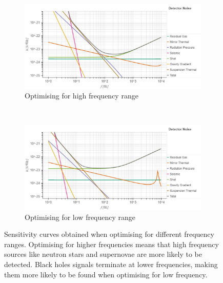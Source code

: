 \documentclass{article}
\begin{document}
    \begin{figure}[h!]
\centering
\begin{subfigure}{.8\textwidth}
        \centering
\includegraphics[width=1\linewidth, trim = {0 0 0 1cm}, clip]{HighFreq.pdf}
         \caption{Optimising for high frequency range}
         \end{subfigure}%
         \\
        \begin{subfigure}{.8\textwidth}
        \centering
        \includegraphics[width=1\linewidth, trim = {0 0 0 0.9cm}, clip]
{LowFreq.pdf}
         \caption{Optimising for low frequency range}
         \end{subfigure}
         \caption{Sensitivity curves obtained when optimising for
           different frequency ranges. Optimising for higher
           frequencies means that high frequency sources like neutron
           stars and supernovae are more likely to be detected. Black
           holes signals terminate at lower frequencies, making them
           more likely to be found when optimising for low frequency.}
         \label{fig::LowHighFreq}
 \end{figure}
\end{document}
